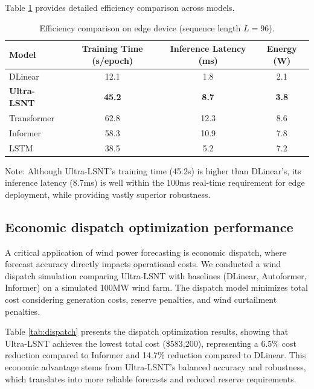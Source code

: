 \documentclass[review,3p,times,draft]{elsarticle}
\begin{document}
Table \ref{tab:efficiency} provides detailed efficiency comparison across models.

\begin{table}[htbp]
\centering
\caption{Efficiency comparison on edge device (sequence length $L=96$).}
\label{tab:efficiency}
\begin{tabular}{@{}lccc@{}}
\toprule
\textbf{Model} & \textbf{Training Time (s/epoch)} & \textbf{Inference Latency (ms)} & \textbf{Energy (W)} \\
\midrule
DLinear & 12.1 & 1.8 & 2.1 \\
\textbf{Ultra-LSNT} & \textbf{45.2} & \textbf{8.7} & \textbf{3.8} \\
Transformer & 62.8 & 12.3 & 8.6 \\
Informer & 58.3 & 10.9 & 7.8 \\
LSTM & 38.5 & 5.2 & 7.2 \\
\bottomrule
\end{tabular}
\begin{tablenotes}
\small
\item Note: Although Ultra-LSNT's training time (45.2s) is higher than DLinear's, its inference latency (8.7ms) is well within the 100ms real-time requirement for edge deployment, while providing vastly superior robustness.
\end{tablenotes}
\end{table}

\subsection{Economic dispatch optimization performance}
A critical application of wind power forecasting is economic dispatch, where forecast accuracy directly impacts operational costs. We conducted a wind dispatch simulation comparing Ultra-LSNT with baselines (DLinear, Autoformer, Informer) on a simulated 100MW wind farm. The dispatch model minimizes total cost considering generation costs, reserve penalties, and wind curtailment penalties.

Table \ref{tab:dispatch} presents the dispatch optimization results, showing that Ultra-LSNT achieves the lowest total cost (\$583,200), representing a 6.5\% cost reduction compared to Informer and 14.7\% reduction compared to DLinear. This economic advantage stems from Ultra-LSNT's balanced accuracy and robustness, which translates into more reliable forecasts and reduced reserve requirements.
\end{document}
